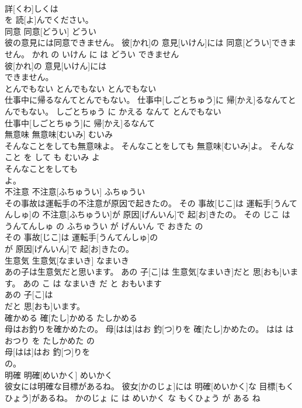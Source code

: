 \documentclass[8pt]{extreport}
\begin{document}
\begin{CJK}{UTF8}{min}
\\	詳[くわ]しくは
\\	を 読[よ]んでください。			
\\	同意	同意[どうい]	どうい	
\\	彼の意見には同意できません。	彼[かれ]の 意見[いけん]には 同意[どうい]できません。	かれ の いけん に は どうい できません	
\\	彼[かれ]の 意見[いけん]には
\\	できません。			
\\	とんでもない	とんでもない	とんでもない	
\\	仕事中に帰るなんてとんでもない。	仕事中[しごとちゅう]に 帰[かえ]るなんてとんでもない。	しごとちゅう に かえる なんて とんでもない	
\\	仕事中[しごとちゅう]に 帰[かえ]るなんて
\\	無意味	無意味[むいみ]	むいみ	
\\	そんなことをしても無意味よ。	そんなことをしても 無意味[むいみ]よ。	そんな こと を して も むいみ よ	
\\	そんなことをしても
\\	よ。			
\\	不注意	不注意[ふちゅうい]	ふちゅうい	
\\	その事故は運転手の不注意が原因で起きたの。	その 事故[じこ]は 運転手[うんてんしゅ]の 不注意[ふちゅうい]が 原因[げんいん]で 起[お]きたの。	その じこ は うんてんしゅ の ふちゅうい が げんいん で おきた の	
\\	その 事故[じこ]は 運転手[うんてんしゅ]の
\\	が 原因[げんいん]で 起[お]きたの。			
\\	生意気	生意気[なまいき]	なまいき	
\\	あの子は生意気だと思います。	あの 子[こ]は 生意気[なまいき]だと 思[おも]います。	あの こ は なまいき だ と おもいます	
\\	あの 子[こ]は
\\	だと 思[おも]います。			
\\	確かめる	確[たし]かめる	たしかめる	
\\	母はお釣りを確かめたの。	母[はは]はお 釣[つ]りを 確[たし]かめたの。	はは は おつり を たしかめた の	
\\	母[はは]はお 釣[つ]りを
\\	の。			
\\	明確	明確[めいかく]	めいかく	
\\	彼女には明確な目標があるね。	彼女[かのじょ]には 明確[めいかく]な 目標[もくひょう]があるね。	かのじょ に は めいかく な もくひょう が ある ね	

\end{CJK}
\end{document}
